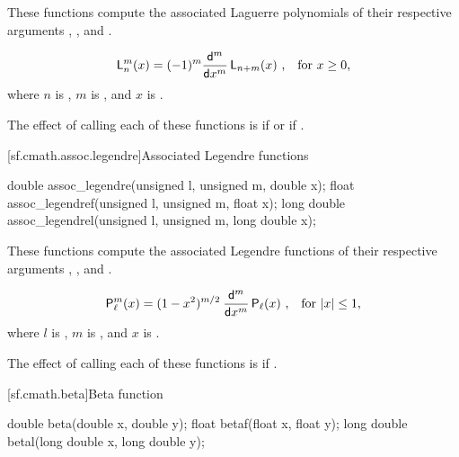 \begin{itemdescr}
\pnum
\effects
These functions compute
the associated Laguerre polynomials
of their respective arguments
, , and .

\pnum
\returns
\[ \mathsf{L}_n^m(x) =
   (-1)^m \frac{\mathsf{d} ^ m}{\mathsf{d}x ^ m} \, \mathsf{L}_{n+m}(x)
   \text{ ,\quad for $x \ge 0$,} \]
where
$n$ is ,
$m$ is , and
$x$ is .

\pnum
\remarks
The effect of calling each of these functions
is 
if  or if .
\end{itemdescr}

[sf.cmath.assoc.legendre]{Associated Legendre functions}%
%
%
%
%
%
\begin{itemdecl}
double       assoc_legendre(unsigned l, unsigned m, double x);
float        assoc_legendref(unsigned l, unsigned m, float x);
long double  assoc_legendrel(unsigned l, unsigned m, long double x);
\end{itemdecl}

\begin{itemdescr}

\pnum
\effects
These functions compute
the associated Legendre functions
of their respective arguments
, , and .

\pnum
\returns
\[ \mathsf{P}_\ell^m(x) = (1 - x^2) ^ {m/2} \:
   \frac{\mathsf{d} ^ m}{\mathsf{d}x ^ m} \, \mathsf{P}_\ell(x)
   \text{ ,\quad for $|x| \le 1$,} \]
where
$l$ is ,
$m$ is , and
$x$ is .

\pnum
\remarks
The effect of calling each of these functions
is 
if .
\end{itemdescr}

[sf.cmath.beta]{Beta function}%
%
%
%
%
%
\begin{itemdecl}
double       beta(double x, double y);
float        betaf(float x, float y);
long double  betal(long double x, long double y);
\end{itemdecl}

